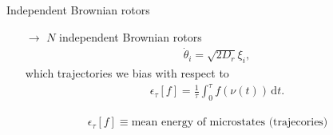 \documentclass{beamer}
\begin{document}
\begin{frame}{Independent Brownian rotors}


\begin{itemize}
  \item[$\rightarrow$] $N$ independent Brownian rotors
  \begin{align*}
  \dot{\theta}_i = \sqrt{2 D_r} \xi_i,
  \end{align*}
  which trajectories we bias with respect to
  \begin{align*}
  \epsilon_{\tau}[f] = \frac{1}{\tau} \int_0^{\tau} f(\nu(t)) \, \text{d}t.
  \end{align*}
\end{itemize}

\return
\begin{align*}
  \epsilon_{\tau}[f] \equiv \text{mean energy of microstates (trajecories)}
\end{align*}


\end{frame}
\end{document}
